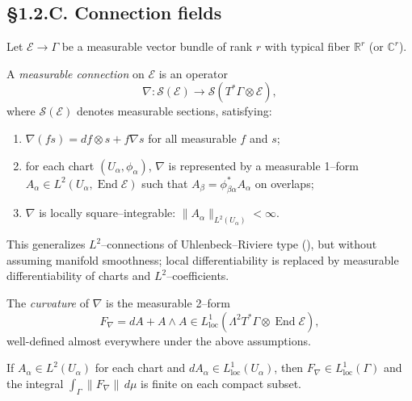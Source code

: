 \subsection*{§1.2.C. Connection fields}

Let $\mathcal{E}\to\Gamma$ be a measurable vector bundle of rank $r$ with typical fiber $\mathbb R^r$ (or $\mathbb C^r$).  

\begin{definition}
A \emph{measurable connection} on $\mathcal{E}$ is an operator
\[
\nabla: \mathcal{S}(\mathcal{E})\to \mathcal{S}(T^\ast\Gamma\otimes\mathcal{E}),
\]
where $\mathcal{S}(\mathcal{E})$ denotes measurable sections, satisfying:
\begin{enumerate}
  \item $\nabla(fs)=df\otimes s+f\nabla s$ for all measurable $f$ and $s$;
  \item for each chart $(U_\alpha,\phi_\alpha)$, $\nabla$ is represented by a measurable 1–form $A_\alpha\in L^2(U_\alpha,\operatorname{End}\mathcal{E})$ such that $A_\beta=\phi_{\beta\alpha}^\ast A_\alpha$ on overlaps;
  \item $\nabla$ is locally square–integrable: $\|A_\alpha\|_{L^2(U_\alpha)}<\infty$.
\end{enumerate}
\end{definition}

\begin{remark}
This generalizes $L^2$–connections of Uhlenbeck–Riviere type (\cite{Uhlenbeck1982,Riviere2007}), but without assuming manifold smoothness; local differentiability is replaced by measurable differentiability of charts and $L^2$–coefficients.
\end{remark}

\begin{definition}
The \emph{curvature} of $\nabla$ is the measurable 2–form
\[
F_\nabla = dA + A\wedge A \in L^1_{\mathrm{loc}}(\Lambda^2 T^\ast\Gamma\otimes\operatorname{End}\mathcal{E}),
\]
well-defined almost everywhere under the above assumptions.
\end{definition}

\begin{lemma}\label{lem:1.2.curv}
If $A_\alpha\in L^2(U_\alpha)$ for each chart and $dA_\alpha\in L^1_{\mathrm{loc}}(U_\alpha)$, then $F_\nabla\in L^1_{\mathrm{loc}}(\Gamma)$ and the integral $\int_\Gamma \|F_\nabla\|\,d\mu$ is finite on each compact subset.
\end{lemma}

